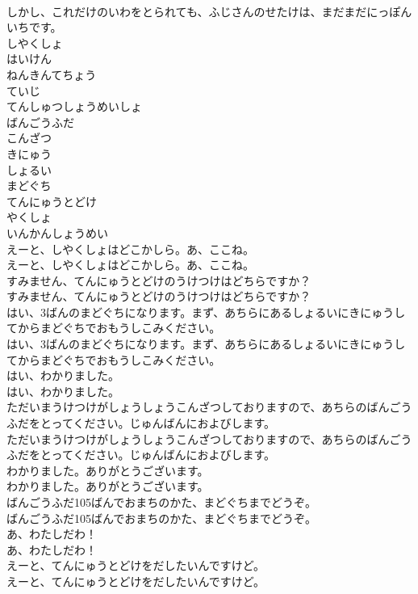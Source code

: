 \documentclass[8pt]{extreport}
\begin{document}
\begin{CJK}{UTF8}{min}
\\	しかし、これだけのいわをとられても、ふじさんのせたけは、まだまだにっぽんいちです。
\\	しやくしょ
\\	はいけん
\\	ねんきんてちょう
\\	ていじ
\\	てんしゅつしょうめいしょ
\\	ばんごうふだ
\\	こんざつ
\\	きにゅう
\\	しょるい
\\	まどぐち
\\	てんにゅうとどけ
\\	やくしょ
\\	いんかんしょうめい
\\	えーと、しやくしょはどこかしら。あ、ここね。
\\	えーと、しやくしょはどこかしら。あ、ここね。
\\	すみません、てんにゅうとどけのうけつけはどちらですか？
\\	すみません、てんにゅうとどけのうけつけはどちらですか？
\\	はい、3ばんのまどぐちになります。まず、あちらにあるしょるいにきにゅうしてからまどぐちでおもうしこみください。
\\	はい、3ばんのまどぐちになります。まず、あちらにあるしょるいにきにゅうしてからまどぐちでおもうしこみください。
\\	はい、わかりました。
\\	はい、わかりました。
\\	ただいまうけつけがしょうしょうこんざつしておりますので、あちらのばんごうふだをとってください。じゅんばんにおよびします。
\\	ただいまうけつけがしょうしょうこんざつしておりますので、あちらのばんごうふだをとってください。じゅんばんにおよびします。
\\	わかりました。ありがとうございます。
\\	わかりました。ありがとうございます。
\\	ばんごうふだ105ばんでおまちのかた、まどぐちまでどうぞ。
\\	ばんごうふだ105ばんでおまちのかた、まどぐちまでどうぞ。
\\	あ、わたしだわ！
\\	あ、わたしだわ！
\\	えーと、てんにゅうとどけをだしたいんですけど。
\\	えーと、てんにゅうとどけをだしたいんですけど。

\end{CJK}
\end{document}
